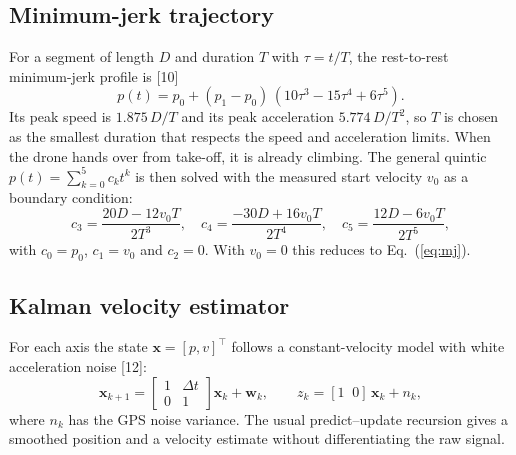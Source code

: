 \subsection{Minimum-jerk trajectory}
For a segment of length $D$ and duration $T$ with $\tau = t/T$, the rest-to-rest minimum-jerk profile is [10]
\begin{equation}
p(t) = p_0 + (p_1 - p_0)\,(10\tau^3 - 15\tau^4 + 6\tau^5).
\label{eq:mj}
\end{equation}
Its peak speed is $1.875\,D/T$ and its peak acceleration $5.774\,D/T^2$, so $T$ is chosen as the smallest duration that respects the speed and acceleration limits. When the drone hands over from take-off, it is already climbing. The general quintic $p(t) = \sum_{k=0}^5 c_k t^k$ is then solved with the measured start velocity $v_0$ as a boundary condition:
\begin{equation}
c_3 = \frac{20D - 12 v_0 T}{2T^3},\quad c_4 = \frac{-30D + 16 v_0 T}{2T^4},\quad c_5 = \frac{12D - 6 v_0 T}{2T^5},
\end{equation}
with $c_0 = p_0$, $c_1 = v_0$ and $c_2 = 0$. With $v_0 = 0$ this reduces to Eq.~(\ref{eq:mj}).

\subsection{Kalman velocity estimator}
For each axis the state $\mathbf{x} = [p, v]^\top$ follows a constant-velocity model with white acceleration noise [12]:
\begin{equation}
\mathbf{x}_{k+1} = \begin{bmatrix}1 & \Delta t\\ 0 & 1\end{bmatrix}\mathbf{x}_k + \mathbf{w}_k, \qquad z_k = [1\;\;0]\,\mathbf{x}_k + n_k,
\end{equation}
where $n_k$ has the GPS noise variance. The usual predict--update recursion gives a smoothed position and a velocity estimate without differentiating the raw signal.
